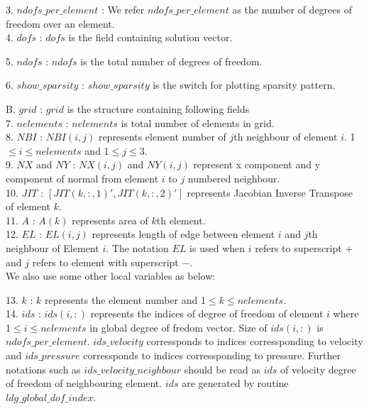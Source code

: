 \documentclass[a4paper,12pt]{book}
\begin{document}
3. $ndofs\_per\_element$ : We refer $ndofs\_per\_element$ as the number of degrees of freedom over an element. \\

4. $dofs$ : $dofs$ is the field containing solution vector.

5. $ndofs$ : $ndofs$ is the total number of degrees of freedom.

6. $show\_sparsity$ : $show\_sparsity$ is the switch for plotting sparsity pattern.

B. $grid$ : $grid$ is the structure containing following fields\\

7. $nelements$ : $nelements$ is total number of elements in grid.\\

8. $NBI$ : $NBI(i,j)$ represents element number of $j$th neighbour of element $i$. 1$\leq i \leq nelements$ and 1$\leq j \leq$3.\\

9. $NX$ and $NY$ : $NX(i,j)$ and $NY(i,j)$ represent x component and y component of normal from  element $i$ to $j$ numbered neighbour.\\

10. $JIT$ : $[JIT(k,:,1)',JIT(k,:,2)']$ represents Jacobian Inverse Transpose of element $k$.\\

11. $A$ : $A(k)$ represents area of $k$th element.\\

12. $EL$ : $EL(i,j)$ represents length of edge between element $i$ and $j$th neighbour of Element $i$. The notation $EL$ is used when $i$ refers to superscript $+$ and $j$ refers to element with superscript $-$.\\

We also use some other local variables as below:

13. $k$ : $k$ represents the element number and 1$\leq k \leq nelements$.\\

14. $ids$ : $ids(i,:)$ represents the indices of degree of freedom of element $i$ where 1$\leq i \leq nelements$ in global degree of fredom vector. Size of $ids(i,:)$ is $ndofs\_per\_element$. $ids\_velocity$ corressponds to indices corressponding to velocity and $ids\_pressure$ corressponds to indices corressponding to pressure. Further notations such as $ids\_velocity\_neighbour$ should be read as $ids$ of velocity degree of freedom of neighbouring element. $ids$ are generated by routine $ldg\_global\_dof\_index$.\\
\end{document}
